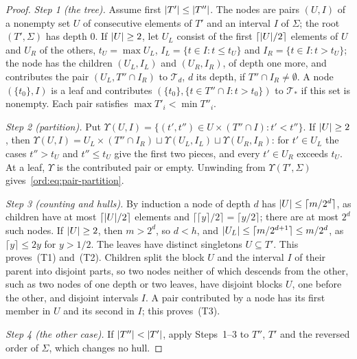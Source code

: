\begin{proof}
\emph{Step 1 (the tree).} Assume first $\lvert T'\rvert\le\lvert T''\rvert$. The nodes are pairs $(U,I)$ of a nonempty set $U$ of
consecutive elements of $T'$ and an interval $I$ of $\Sigma$; the root $(T',\Sigma)$ has depth $0$. If $\lvert U\rvert\ge2$, let
$U_L$ consist of the first $\lceil\lvert U\rvert/2\rceil$ elements of $U$ and $U_R$ of the others, $t_U=\max U_L$,
$I_L=\{t\in I:t\le t_U\}$ and $I_R=\{t\in I:t>t_U\}$; the node has the children $(U_L,I_L)$ and $(U_R,I_R)$, of depth
one more, and contributes the pair $(U_L,T''\cap I_R)$ to $\mathcal T_d$, $d$ its depth, if $T''\cap I_R\ne\emptyset$. A
node $(\{t_0\},I)$ is a leaf and contributes $(\{t_0\},\{t\in T''\cap I:t>t_0\})$ to $\mathcal T_\ast$ if this set is
nonempty. Each pair satisfies $\max T'_i<\min T''_i$.

\emph{Step 2 (partition).} Put $\Upsilon(U,I)=\{(t',t'')\in U\times(T''\cap I):t'<t''\}$. If $\lvert U\rvert\ge2$, then
$\Upsilon(U,I)=U_L\times(T''\cap I_R)\sqcup\Upsilon(U_L,I_L)\sqcup\Upsilon(U_R,I_R)$: for $t'\in U_L$ the cases $t''>t_U$
and $t''\le t_U$ give the first two pieces, and every $t'\in U_R$ exceeds $t_U$. At a leaf, $\Upsilon$ is the contributed
pair or empty. Unwinding from $\Upsilon(T',\Sigma)$ gives~\eqref{ord:eq:pair-partition}.

\emph{Step 3 (counting and hulls).} By induction a node of depth $d$ has $\lvert U\rvert\le\lceil m/2^d\rceil$, as children
have at most $\lceil\lvert U\rvert/2\rceil$ elements and $\lceil\lceil y\rceil/2\rceil=\lceil y/2\rceil$; there are at most
$2^d$ such nodes. If $\lvert U\rvert\ge2$, then $m>2^d$, so $d<h$, and $\lvert U_L\rvert\le\lceil m/2^{d+1}\rceil\le m/2^d$, as
$\lceil y\rceil\le2y$ for $y>1/2$. The leaves have distinct singletons $U\subseteq T'$. This proves~(T1) and~(T2).
Children split the block $U$ and the interval $I$ of their parent into disjoint parts, so two nodes neither of which
descends from the other, such as two nodes of one depth or two leaves, have disjoint blocks $U$, one before the
other, and disjoint intervals $I$. A pair contributed by a node has its first member in $U$ and its second in $I$; this
proves~(T3).

\emph{Step 4 (the other case).} If $\lvert T''\rvert<\lvert T'\rvert$, apply Steps~1--3 to $T''$, $T'$ and the reversed order of
$\Sigma$, which changes no hull.
\end{proof}

